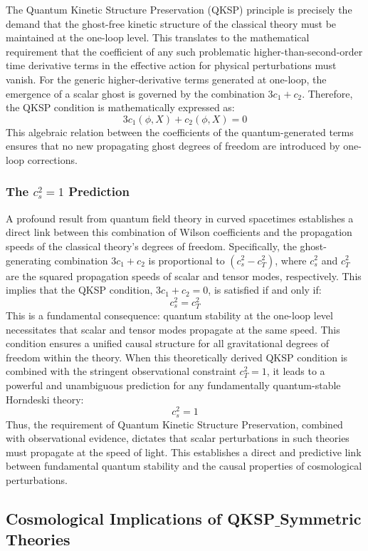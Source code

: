 \documentclass[twocolumn]{aastex631}
\begin{document}
The Quantum Kinetic Structure Preservation (QKSP) principle is precisely the demand that the ghost-free kinetic structure of the classical theory must be maintained at the one-loop level. This translates to the mathematical requirement that the coefficient of any such problematic higher-than-second-order time derivative terms in the effective action for physical perturbations must vanish. For the generic higher-derivative terms generated at one-loop, the emergence of a scalar ghost is governed by the combination $3c_1 + c_2$. Therefore, the QKSP condition is mathematically expressed as:
$$3c_1(\phi, X) + c_2(\phi, X) = 0$$
This algebraic relation between the coefficients of the quantum-generated terms ensures that no new propagating ghost degrees of freedom are introduced by one-loop corrections.

\subsubsection{The $c_s^2=1$ Prediction}
A profound result from quantum field theory in curved spacetimes establishes a direct link between this combination of Wilson coefficients and the propagation speeds of the classical theory's degrees of freedom. Specifically, the ghost-generating combination $3c_1 + c_2$ is proportional to $(c_s^2 - c_T^2)$, where $c_s^2$ and $c_T^2$ are the squared propagation speeds of scalar and tensor modes, respectively. This implies that the QKSP condition, $3c_1 + c_2 = 0$, is satisfied if and only if:
$$c_s^2 = c_T^2$$
This is a fundamental consequence: quantum stability at the one-loop level necessitates that scalar and tensor modes propagate at the same speed. This condition ensures a unified causal structure for all gravitational degrees of freedom within the theory. When this theoretically derived QKSP condition is combined with the stringent observational constraint $c_T^2=1$, it leads to a powerful and unambiguous prediction for any fundamentally quantum-stable Horndeski theory:
$$c_s^2 = 1$$
Thus, the requirement of Quantum Kinetic Structure Preservation, combined with observational evidence, dictates that scalar perturbations in such theories must propagate at the speed of light. This establishes a direct and predictive link between fundamental quantum stability and the causal properties of cosmological perturbations.

\subsection{Cosmological Implications of QKSP\ensuremath{\_}Symmetric Theories}
\end{document}
